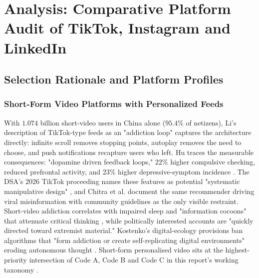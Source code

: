 \documentclass[11pt]{article}
\begin{document}
\section{Analysis: Comparative Platform Audit of TikTok, Instagram and LinkedIn}

\subsection{Selection Rationale and Platform Profiles}

\subsubsection{Short-Form Video Platforms with Personalized Feeds}
\label{sec:shortform_personalized_feeds} With $1.074$ billion short-video users in China alone ($95.4\%$ of netizens), Li's description of TikTok-type feeds as an "addiction loop" \parencites[2]{8958037} captures the architecture directly: infinite scroll removes stopping points, autoplay removes the need to choose, and push notifications recapture users who left. Hu traces the measurable consequences: "dopamine driven feedback loops," $22\%$ higher compulsive checking, reduced prefrontal activity, and $23\%$ higher depressive-symptom incidence \parencites[2]{3303310}[20]{3303310}. The DSA's 2026 TikTok proceeding names these features as potential "systematic manipulative design" \parencites[2]{8958037}[15]{6502223}, and Chitra et al. document the same recommender driving viral misinformation with community guidelines as the only visible restraint. Short-video addiction correlates with impaired sleep and "information cocoons" that attenuate critical thinking \parencites[6]{8958037}[8]{6502223}, while politically interested accounts are "quickly directed toward extremist material." Kostenko's digital-ecology provisions ban algorithms that "form addiction or create self-replicating digital environments" eroding autonomous thought \parencites[119]{2977039}. Short-form personalised video sits at the highest-priority intersection of Code A, Code B and Code C in this report's working taxonomy \parencites[2]{8958037}[20]{3303310}[119]{2977039}[15]{6502223}[2]{3303310}[6]{6295677}.
\end{document}
